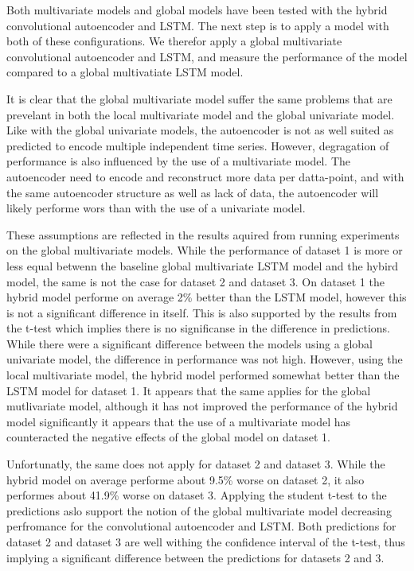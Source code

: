 Both multivariate models and global models have been tested with the hybrid convolutional autoencoder and LSTM.
The next step is to apply a model with both of these configurations.
We therefor apply a global multivariate convolutional autoencoder and LSTM, and measure the performance of the model
compared to a global multivatiate LSTM model.

It is clear that the global multivariate model suffer the same problems that are prevelant in both the local multivariate model
and the global univariate model.
Like with the global univariate models, the autoencoder is not as well suited as predicted to encode multiple independent time series.
However, degragation of performance is also influenced by the use of a multivariate model.
The autoencoder need to encode and reconstruct more data per datta-point, and with the same autoencoder structure
as well as lack of data, the autoencoder will likely performe wors than with the use of a univariate model.

These assumptions are reflected in the results aquired from running experiments on the global multivariate models.
While the performance of dataset 1 is more or less equal betwenn the baseline global multivariate LSTM model and the hybird model,
the same is not the case for dataset 2 and dataset 3.
On dataset 1 the hybrid model performe on average 2\% better than the LSTM model, however this is not a significant difference in itself.
This is also supported by the results from the t-test which implies there is no significanse in the difference in predictions.
While there were a significant difference between the models using a global univariate model, the difference in performance was not high.
However, using the local multivariate model, the hybrid model performed somewhat better than the LSTM model for dataset 1.
It appears that the same applies for the global mutlivariate model, although it has not improved the performance of the hybrid model significantly
it appears that the use of a multivariate model has counteracted the negative effects of the global model on dataset 1.

Unfortunatly, the same does not apply for dataset 2 and dataset 3.
While the hybrid model on average performe about 9.5\% worse on dataset 2, it also performes about 41.9\% worse on dataset 3.
Applying the student t-test to the predictions aslo support the notion of the global multivariate model decreasing perfromance for the
convolutional autoencoder and LSTM.
Both predictions for dataset 2 and dataset 3 are well withing the confidence interval of the t-test,
thus implying a significant difference between the predictions for datasets 2 and 3.

